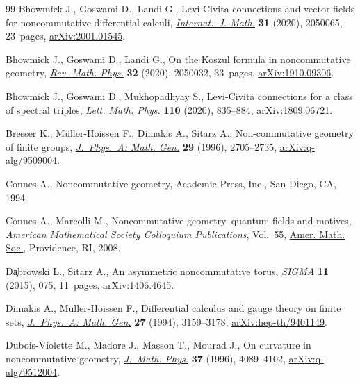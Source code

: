 \documentclass[pdftex]{sigma}
\numberwithin{equation}{section}
\begin{document}
\begin{thebibliography}{99}
Bhowmick J., Goswami D., Landi G., Levi-{C}ivita connections and vector fields
 for noncommutative differential calculi, \href{https://doi.org/10.1142/S0129167X20500652}{\textit{Internat.~J. Math.}}
 \textbf{31} (2020), 2050065, 23~pages, \href{https://arxiv.org/abs/2001.01545}{arXiv:2001.01545}.

Bhowmick J., Goswami D., Landi G., On the {K}oszul formula in noncommutative
 geometry, \href{https://doi.org/10.1142/S0129055X20500324}{\textit{Rev. Math. Phys.}} \textbf{32} (2020), 2050032, 33~pages,
 \href{https://arxiv.org/abs/1910.09306}{arXiv:1910.09306}.

Bhowmick J., Goswami D., Mukhopadhyay S., Levi-{C}ivita connections for a class
 of spectral triples, \href{https://doi.org/10.1007/s11005-019-01241-4}{\textit{Lett. Math. Phys.}} \textbf{110} (2020),
 835--884, \href{https://arxiv.org/abs/1809.06721}{arXiv:1809.06721}.

Bresser K., M\"uller-Hoissen F., Dimakis A., Sitarz A., Non-commutative
 geometry of finite groups, \href{https://doi.org/10.1088/0305-4470/29/11/010}{\textit{J.~Phys.~A: Math. Gen.}} \textbf{29}
 (1996), 2705--2735, \href{https://arxiv.org/abs/q-alg/9509004}{arXiv:q-alg/9509004}.

Connes A., Noncommutative geometry, Academic Press, Inc., San Diego, CA, 1994.

Connes A., Marcolli M., Noncommutative geometry, quantum fields and motives,
 \textit{American Mathematical Society Colloquium Publications}, Vol.~55,
 \href{https://doi.org/10.1090/coll/055}{Amer. Math. Soc.}, Providence, RI, 2008.

D\c{a}browski L., Sitarz A., An asymmetric noncommutative torus, \href{https://doi.org/10.3842/SIGMA.2015.075}{\textit{SIGMA}}
 \textbf{11} (2015), 075, 11~pages, \href{https://arxiv.org/abs/1406.4645}{arXiv:1406.4645}.

Dimakis A., M\"uller-Hoissen F., Differential calculus and gauge theory on
 finite sets, \href{https://doi.org/10.1088/0305-4470/27/9/028}{\textit{J.~Phys.~A: Math. Gen.}} \textbf{27} (1994), 3159--3178,
 \href{https://arxiv.org/abs/hep-th/9401149}{arXiv:hep-th/9401149}.

Dubois-Violette M., Madore J., Masson T., Mourad J., On curvature in
 noncommutative geometry, \href{https://doi.org/10.1063/1.531618}{\textit{J.~Math. Phys.}} \textbf{37} (1996),
 4089--4102, \href{https://arxiv.org/abs/q-alg/9512004}{arXiv:q-alg/9512004}.


\end{thebibliography}
\end{document}
